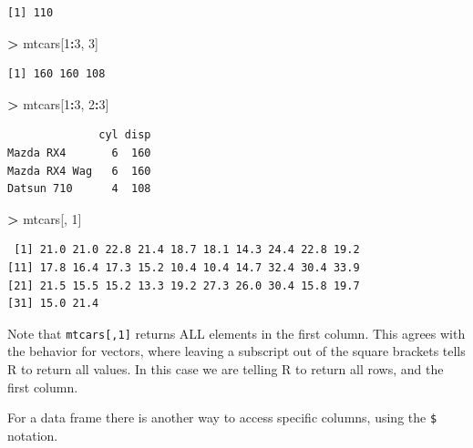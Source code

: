 \documentclass[]{krantz}
\makeatletter
\newenvironment{Shaded}{\begin{snugshade}}{\end{snugshade}}
\newcommand{\DecValTok}[1]{\textcolor[rgb]{0.06,0.06,0.06}{#1}}
\newcommand{\NormalTok}[1]{#1}
\newcommand{\OperatorTok}[1]{\textcolor[rgb]{0.43,0.43,0.43}{\textbf{#1}}}
\newcommand{\StringTok}[1]{\textcolor[rgb]{0.5,0.5,0.5}{#1}}
\newenvironment{kframe}{%
\medskip{}
\setlength{\fboxsep}{.8em}
 \def\at@end@of@kframe{}%
 \ifinner\ifhmode%
  \def\at@end@of@kframe{\end{minipage}}%
  \begin{minipage}{\columnwidth}%
 \fi\fi%
 \def\FrameCommand##1{\hskip\@totalleftmargin \hskip-\fboxsep
 \colorbox{shadecolor}{##1}\hskip-\fboxsep
     \hskip-\linewidth \hskip-\@totalleftmargin \hskip\columnwidth}%
 \MakeFramed {\advance\hsize-\width
   \@totalleftmargin\z@ \linewidth\hsize
   \@setminipage}}%
 {\par\unskip\endMakeFramed%
 \at@end@of@kframe}
\renewenvironment{Shaded}{\begin{kframe}}{\end{kframe}}
\makeatother
\begin{document}
\begin{verbatim}
[1] 110
\end{verbatim}

\begin{Shaded}
\begin{Highlighting}[]
\OperatorTok{>}\StringTok{ }\NormalTok{mtcars[}\DecValTok{1}\OperatorTok{:}\DecValTok{3}\NormalTok{, }\DecValTok{3}\NormalTok{]}
\end{Highlighting}
\end{Shaded}

\begin{verbatim}
[1] 160 160 108
\end{verbatim}

\begin{Shaded}
\begin{Highlighting}[]
\OperatorTok{>}\StringTok{ }\NormalTok{mtcars[}\DecValTok{1}\OperatorTok{:}\DecValTok{3}\NormalTok{, }\DecValTok{2}\OperatorTok{:}\DecValTok{3}\NormalTok{]}
\end{Highlighting}
\end{Shaded}

\begin{verbatim}
              cyl disp
Mazda RX4       6  160
Mazda RX4 Wag   6  160
Datsun 710      4  108
\end{verbatim}

\begin{Shaded}
\begin{Highlighting}[]
\OperatorTok{>}\StringTok{ }\NormalTok{mtcars[, }\DecValTok{1}\NormalTok{]}
\end{Highlighting}
\end{Shaded}

\begin{verbatim}
 [1] 21.0 21.0 22.8 21.4 18.7 18.1 14.3 24.4 22.8 19.2
[11] 17.8 16.4 17.3 15.2 10.4 10.4 14.7 32.4 30.4 33.9
[21] 21.5 15.5 15.2 13.3 19.2 27.3 26.0 30.4 15.8 19.7
[31] 15.0 21.4
\end{verbatim}

Note that \texttt{mtcars{[},1{]}} returns ALL elements in the first column. This agrees with the behavior for vectors, where leaving a subscript out of the square brackets tells R to return all values. In this case we are telling R to return all rows, and the first column.

For a data frame there is another way to access specific columns, using the \texttt{\$} notation.

\begin{Shaded}
\end{Shaded}
\end{document}
